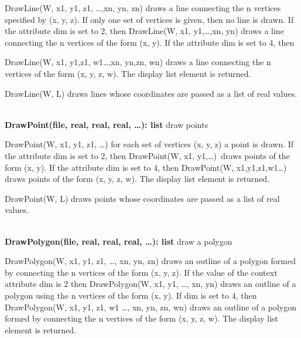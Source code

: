 \documentclass[letterpaper]{article}
\begin{document}
\bigskip

{
\textsf{DrawLine(W, x1, y1, z1, {\dots},xn, yn, zn)} draws a line connecting the n vertices specified by (x, y, z). If
only one set of vertices is given, then no line is drawn. If the attribute \textsf{dim} is set to 2, then
\textsf{DrawLine(W, x1, y1,{\dots},xn, yn) }draws a line connecting the n vertices of the form (x, y). If the
attribute \textsf{dim} is set to 4, then }

{
\textsf{DrawLine(W, x1, y1,z1, w1{\dots},xn, yn,zn, wn) }draws a line connecting the n vertices of the form (x, y, z,
w). The display list element is returned.}


\bigskip

{
DrawLine(W, L) draws lines whose coordinates are passed as a list of real values.}

\noindent\hrulefill\\
\noindent\textsf{\textbf{DrawPoint(file, real, real, real, {\dots}): list}}
\hfill draw points


\bigskip

{
\textsf{DrawPoint(W, x1, y1, z1, {\dots})} for each set of vertices (x, y, z) a point is drawn. If the attribute
\textsf{dim} is set to 2, then \textsf{DrawPoint(W, x1, y1,{\dots})}\texttt{ }draws points of the form (x, y). If the
attribute \textsf{dim} is set to 4, then \textsf{DrawPoint(W, x1,y1,z1,w1{\dots}) }draws points of the form (x, y, z,
w). The display list element is returned.}


\bigskip

DrawPoint(W, L) draws points whose coordinates are passed as a list of
real values.

\noindent\hrulefill\\
\noindent\textsf{\textbf{DrawPolygon(file, real, real, real, {\dots}): list}}
\hfill draw a polygon


\bigskip

\textsf{DrawPolygon(W, x1, y1, z1, {\dots}, xn, yn, zn)} draws an
outline of a polygon formed by connecting the n vertices of the form
(x, y, z). If the value of the context attribute \textsf{dim} is 2
then \textsf{DrawPolygon(W, x1, y1, {\dots}, xn, yn)} draws an outline
of a polygon using the n vertices of the form (x, y). If
\textsf{dim} is set to 4, then \textsf{DrawPolygon(W, x1, y1, z1, w1
{\dots}, xn, yn, zn, wn)} draws an outline of a polygon formed by
connecting the n vertices of the form (x, y, z, w). The display list
element is returned.
\end{document}
